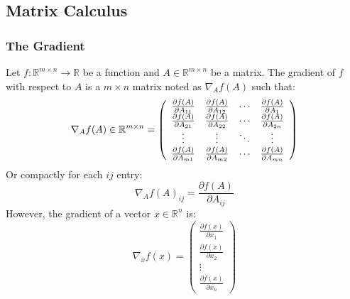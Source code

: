 \documentclass[twoside,twocolumn]{article}
\begin{document}
\subsection{Matrix Calculus}
\subsubsection{The Gradient}
Let $f:\mathbb{R}^{m\times n}\rightarrow\mathbb{R}$ be a function and
$A \in \mathbb{R}^{m \times n}$ be a matrix. The gradient of $f$ with respect to
$A$ is a $m \times n$ matrix noted as $\nabla_A f(A)$ such that:
\begin{equation}
  \nabla _ { A } f ( A ) \in \mathbb { R } ^ { m \times n } = \left(
  \begin{array} { c c c c } { \frac { \partial f ( A ) } { \partial A _ { 11 } } } & { \frac { \partial f ( A ) } { \partial A _ { 12 } } } & { \cdots } & { \frac { \partial f ( A ) } { \partial A _ { 1 } } } \\ { \frac { \partial f ( A ) } { \partial A _ { 21 } } } & { \frac { \partial f ( A ) } { \partial A _ { 22 } } } & { \cdots } & { \frac { \partial f ( A ) } { \partial A _ { 2 n } } } \\ { \vdots } & { \vdots } & { \ddots } & { \vdots } \\ { \frac { \partial f ( A ) } { \partial A _ { m 1 } } } & { \frac { \partial f ( A ) } { \partial A _ { m 2 } } } & { \cdots } & { \frac { \partial f ( A ) } { \partial A _ { m n } } } \end{array} \right)
\end{equation}
Or compactly for each $ij$ entry:
\begin{equation}
  \nabla _ { A } f ( A ) _ { i j } = \frac { \partial f ( A ) } { \partial A _ { i j } }
\end{equation}
However, the gradient of a vector $x \in \mathbb{R}^n$ is:
\begin{equation}
  \nabla _ { x } f ( x ) = \left( \begin{array} { c } { \frac { \partial f ( x ) } { \partial x _ { 1 } } } \\ { \frac { \partial f ( x ) } { \partial x _ { 2 } } } \\ { \vdots } \\ { \frac { \partial f ( x ) } { \partial x _ { n } } } \end{array} \right)
\end{equation}
\end{document}
